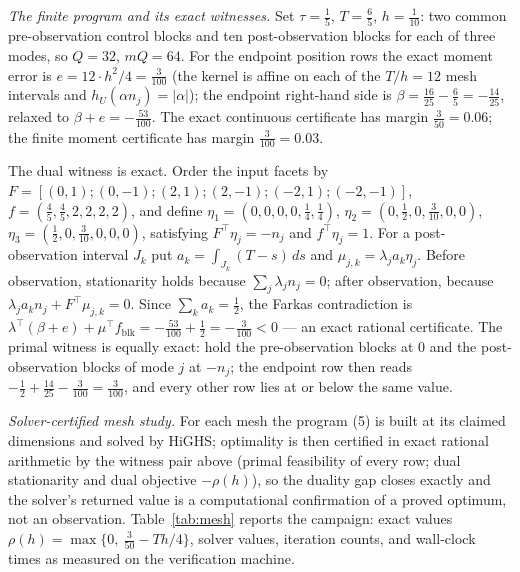 \documentclass[10pt,twocolumn]{article}
\theoremstyle{plain}
\theoremstyle{definition}
\theoremstyle{remark}
\begin{document}
\emph{The finite program and its exact witnesses.} Set
\(\tau = \tfrac15\), \(T = \tfrac65\), \(h = \tfrac1{10}\): two common
pre-observation control blocks and ten post-observation blocks for each of
three modes, so \(Q = 32\), \(mQ = 64\). For the endpoint position rows the
exact moment error is \(e = 12 \cdot h^2/4 = \tfrac{3}{100}\) (the kernel is
affine on each of the \(T/h = 12\) mesh intervals and
\(h_U(\alpha n_j) = |\alpha|\)); the endpoint right-hand side is
\(\beta = \tfrac{16}{25} - \tfrac65 = -\tfrac{14}{25}\), relaxed to
\(\beta + e = -\tfrac{53}{100}\). The exact continuous certificate has
margin \(\tfrac{3}{50} = 0.06\); the finite moment certificate has margin
\(\tfrac{3}{100} = 0.03\).

The dual witness is exact. Order the input facets by
\(F = [(0,1);(0,-1);(2,1);(2,-1);(-2,1);(-2,-1)]\),
\(f = (\tfrac45, \tfrac45, 2, 2, 2, 2)\), and define
\(\eta_1 = (0,0,0,0,\tfrac14,\tfrac14)\),
\(\eta_2 = (0,\tfrac12,0,\tfrac3{10},0,0)\),
\(\eta_3 = (\tfrac12,0,\tfrac3{10},0,0,0)\), satisfying
\(F^\top \eta_j = -n_j\) and \(f^\top \eta_j = 1\). For a post-observation
interval \(J_k\) put \(a_k = \int_{J_k} (T - s)\, ds\) and
\(\mu_{j,k} = \lambda_j a_k \eta_j\). Before observation, stationarity holds
because \(\sum_j \lambda_j n_j = 0\); after observation, because
\(\lambda_j a_k n_j + F^\top \mu_{j,k} = 0\). Since
\(\sum_k a_k = \tfrac12\), the Farkas contradiction is
\(\lambda^\top(\beta + e) + \mu^\top f_{\mathrm{blk}} = -\tfrac{53}{100} +
\tfrac12 = -\tfrac{3}{100} < 0\) --- an exact rational certificate. The
primal witness is equally exact: hold the pre-observation blocks at \(0\) and
the post-observation blocks of mode \(j\) at \(-n_j\); the endpoint row then
reads \(-\tfrac12 + \tfrac{14}{25} - \tfrac{3}{100} = \tfrac{3}{100}\), and
every other row lies at or below the same value.

\emph{Solver-certified mesh study.} For each mesh the program (5) is built
at its claimed dimensions and solved by HiGHS; optimality is then certified
in exact rational arithmetic by the witness pair above (primal feasibility of
every row; dual stationarity and dual objective \(-\rho(h)\)), so the duality
gap closes exactly and the solver's returned value is a computational
confirmation of a proved optimum, not an observation.
Table~\ref{tab:mesh} reports the campaign: exact values
\(\rho(h) = \max\{0,\ \tfrac{3}{50} - Th/4\}\), solver values, iteration
counts, and wall-clock times as measured on the verification machine.
\end{document}
